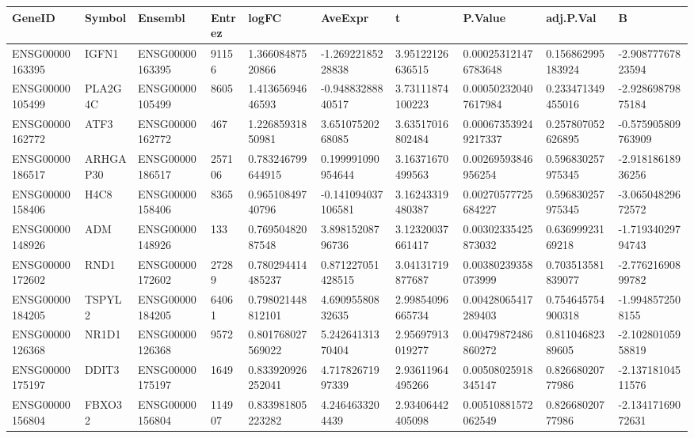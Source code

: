 \begingroup
\tiny
\setlength{\tabcolsep}{2pt}
\renewcommand{\arraystretch}{1.18}
\begin{tabular}{@{}llllllllll@{}}
\toprule
GeneID & Symbol & Ensembl & Entrez & logFC & AveExpr & t & P.Value & adj.P.Val & B \\
\midrule
ENSG00000163395 & IGFN1 & ENSG00000163395 & 91156 & 1.36608487520866 & -1.26922185228838 & 3.95122126636515 & 0.000253121476783648 & 0.156862995183924 & -2.90877767823594 \\
ENSG00000105499 & PLA2G4C & ENSG00000105499 & 8605 & 1.41365694646593 & -0.94883288840517 & 3.73111874100223 & 0.000502320407617984 & 0.233471349455016 & -2.92869879875184 \\
ENSG00000162772 & ATF3 & ENSG00000162772 & 467 & 1.22685931850981 & 3.65107520268085 & 3.63517016802484 & 0.000673539249217337 & 0.257807052626895 & -0.575905809763909 \\
ENSG00000186517 & ARHGAP30 & ENSG00000186517 & 257106 & 0.783246799644915 & 0.199991090954644 & 3.16371670499563 & 0.00269593846956254 & 0.596830257975345 & -2.91818618936256 \\
ENSG00000158406 & H4C8 & ENSG00000158406 & 8365 & 0.96510849740796 & -0.141094037106581 & 3.16243319480387 & 0.00270577725684227 & 0.596830257975345 & -3.06504829672572 \\
ENSG00000148926 & ADM & ENSG00000148926 & 133 & 0.76950482087548 & 3.89815208796736 & 3.12320037661417 & 0.00302335425873032 & 0.63699923169218 & -1.71934029794743 \\
ENSG00000172602 & RND1 & ENSG00000172602 & 27289 & 0.780294414485237 & 0.871227051428515 & 3.04131719877687 & 0.00380239358073999 & 0.703513581839077 & -2.77621690899782 \\
ENSG00000184205 & TSPYL2 & ENSG00000184205 & 64061 & 0.798021448812101 & 4.69095580832635 & 2.99854096665734 & 0.00428065417289403 & 0.754645754900318 & -1.9948572508155 \\
ENSG00000126368 & NR1D1 & ENSG00000126368 & 9572 & 0.801768027569022 & 5.24264131370404 & 2.95697913019277 & 0.00479872486860272 & 0.81104682389605 & -2.10280105958819 \\
ENSG00000175197 & DDIT3 & ENSG00000175197 & 1649 & 0.833920926252041 & 4.71782671997339 & 2.93611964495266 & 0.00508025918345147 & 0.82668020777986 & -2.13718104511576 \\
ENSG00000156804 & FBXO32 & ENSG00000156804 & 114907 & 0.833981805223282 & 4.2464633204439 & 2.93406442405098 & 0.00510881572062549 & 0.82668020777986 & -2.13417169072631 \\

\end{tabular}
